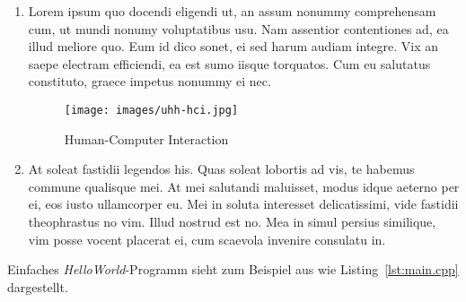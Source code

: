 \documentclass[a4paper,10pt]{article}
\begin{document}
\kopf
\renewcommand{\figurename}{Figure}

\begin{enumerate}

\item Lorem ipsum quo docendi eligendi ut, an assum nonummy comprehensam cum, ut mundi nonumy voluptatibus usu. Nam assentior contentiones ad, ea illud meliore quo. Eum id dico sonet, ei sed harum audiam integre. Vix an saepe electram efficiendi, ea est sumo iisque torquatos. Cum eu salutatus constituto, graece impetus nonummy ei nec.


\begin{figure}[ht]
\centering \texttt{[image: images/uhh-hci.jpg]}
\caption{Human-Computer Interaction}
\label{fig:wwu_logo}
\end{figure}

\item At soleat fastidii legendos his. Quas soleat lobortis ad vis, te habemus commune qualisque mei. At mei salutandi maluisset, modus idque aeterno per ei, eos iusto ullamcorper eu. Mei in soluta interesset delicatissimi, vide fastidii theophrastus no vim. Illud nostrud est no. Mea in simul persius similique, vim posse vocent placerat ei, cum scaevola invenire consulatu in.

\end{enumerate}


Einfaches \emph{HelloWorld}-Programm sieht zum Beispiel aus wie Listing~\ref{lst:main.cpp} dargestellt.

\end{document}
